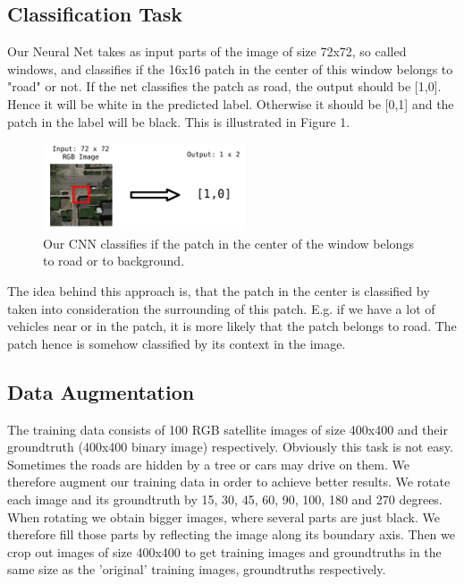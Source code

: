 \documentclass[10pt,conference,compsocconf]{IEEEtran}
\begin{document}
\subsection{Classification Task}
Our Neural Net takes as input parts of the image of size 72x72, so called windows, and classifies if the 16x16 patch in the center of this window belongs to "road" or not. If the net classifies the patch as road, the output should be [1,0]. Hence it will be white in the predicted label.  Otherwise it should be [0,1] and the patch in the label will be black. This is illustrated in Figure 1. 
\begin{figure}[htbp]
	\centering
	\includegraphics[width=6cm]{images/classificationTask.png}
	\caption{Our CNN classifies if the patch in the center of the window belongs to road or to background.}
	\vspace{-3mm}
	\label{fig:clas}
\end{figure}

The idea behind this approach is, that the patch in the center is classified by taken into consideration the surrounding of this patch. E.g. if we have a lot of vehicles near or in the patch, it is more likely that the patch belongs to road. The patch hence is somehow classified by its context in the image. \\


\subsection{Data Augmentation}

The training data consists of 100 RGB satellite images of size 400x400 and their groundtruth (400x400 binary image) respectively. 
Obviously this task is not easy. Sometimes the roads are hidden by a tree or cars may drive on them. 
We therefore augment our training data in order to achieve better results. We rotate each image and its groundtruth by 15, 30, 45, 60, 90, 100, 180 and 270 degrees. When rotating we obtain bigger images, where several parts are just black. We therefore fill those parts by reflecting the image along its boundary axis. Then we crop out images of size 400x400 to get training images and groundtruths in the same size as the 'original' training images, groundtruths respectively.
\end{document}
